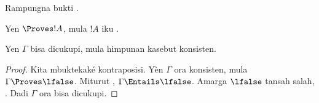 \documentclass[../../../include/open-logic-section]{subfiles}
\begin{document}
\begin{prob}
  Rampungna bukti .
\end{prob}
\tagendprob

\begin{cor}
Yen $\Proves !A$, mula $!A$ iku .
\end{cor}

\begin{cor}
Yen $\Gamma$ bisa dicukupi, mula himpunan kasebut konsisten.
\end{cor}

\begin{proof}
Kita mbuktekaké kontraposisi. Yèn $\Gamma$ ora konsisten, mula
$\Gamma\Proves\lfalse$. Miturut ,
$\Gamma\Entails\lfalse$. Amarga $\lfalse$ tansah salah,
.
Dadi $\Gamma$ ora bisa dicukupi.
\end{proof}
\end{document}
